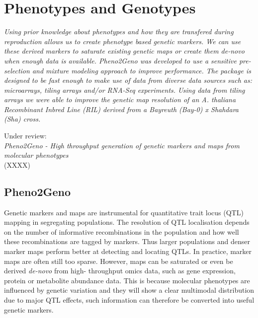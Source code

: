 \chapter{Phenotypes and Genotypes}
\label{chap:pheno2geno}
\emph{Using prior knowledge about phenotypes and how they are transfered during 
reproduction allows us to create phenotype based genetic markers. We can use 
these derived markers to saturate existing genetic maps or create them de-novo 
when enough data is available. Pheno2Geno was developed to use a sensitive 
pre-selection and mixture modeling approach to improve performance. The package 
is designed to be fast enough to make use of data from diverse data sources such 
as: microarrays, tiling arrays and/or RNA-Seq experiments. Using data from tiling 
arrays we were able to improve the genetic map resolution of an A. thaliana 
Recombinant Inbred Line (RIL) derived from a Bayreuth (Bay-0) x Shahdara (Sha) cross.}

\null
\vfill

\begin{myexampleblock}{Under review:}
  \\
  \emph{Pheno2Geno - High throughput generation of genetic markers and maps from molecular phenotypes}\\
   (XXXX)
\end{myexampleblock}
\newpage

\section{Pheno2Geno}
Genetic markers and maps are instrumental for quantitative trait locus (QTL) mapping in segregating 
populations. The resolution of QTL localisation depends on the number of informative recombinations 
in the population and how well these recombinations are tagged by markers. Thus larger populations 
and denser marker maps perform better at detecting and locating QTLs. In practice, marker maps are 
often still too sparse. However, maps can be saturated or even be derived \emph{de-novo} from high-
throughput omics data, such as gene expression, protein or metabolite abundance data. This is because 
molecular phenotypes are influenced by genetic variation and they will show a clear multimodal 
distribution due to major QTL effects, such information can therefore be converted into useful 
genetic markers.

